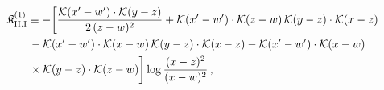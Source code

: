 \begingroup\small
\begin{align}\label{eq:K-1_rm_II_I}
&\mathfrak{K}^{(1)}_{\rm II.I}\equiv -\bigg[\frac{\mathcal{K}(x'-w')\cdot\mathcal{K}(y-z)}{2\,(z-w)^{2}} +\mathcal{K}(x'-w')\cdot\mathcal{K}(z-w)\, \mathcal{K}(y-z)\cdot\mathcal{K}(x-z)\notag\\
&\quad\quad -\mathcal{K}(x'-w')\cdot\mathcal{K}(x-w)\, \mathcal{K}(y-z)\cdot\mathcal{K}(x-z) -\mathcal{K}(x'-w')\cdot\mathcal{K}(x-w)\notag\\
&\quad\quad \times \mathcal{K}(y-z)\cdot\mathcal{K}(z-w)\bigg]\log\frac{(x-z)^{2}}{(x-w)^{2}}\,,
\end{align}
\endgroup
